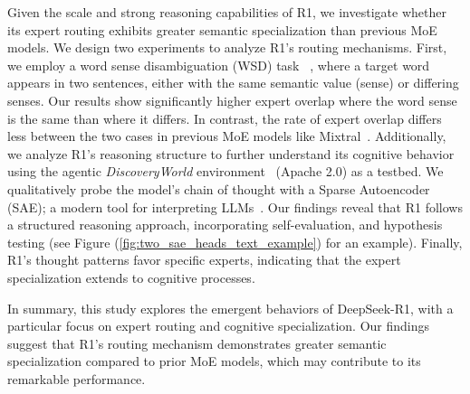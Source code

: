 Given the scale and strong reasoning capabilities %
of R1, we investigate whether its expert routing exhibits greater semantic specialization than previous MoE models.
We design two experiments to analyze R1’s routing mechanisms. First, we employ a word sense disambiguation (WSD) task ~\cite{pilehvar2018wic}, where a target word appears in two sentences, either with the same semantic value (sense) or differing senses. 
Our results show significantly higher expert overlap where the word sense is the same than where it differs.
In contrast, the rate of expert overlap differs less between the two cases in previous MoE models like Mixtral~\cite{jiang2024mixtral}. 
Additionally, we analyze R1's reasoning structure to further understand its cognitive behavior using the agentic \textit{DiscoveryWorld} environment~\cite{jansen2024discoveryworld} (Apache 2.0) as a testbed. We qualitatively probe the model's chain of thought with a Sparse Autoencoder (SAE); a modern tool for interpreting LLMs~\cite{cunningham2023sparse}. Our findings reveal that R1 follows a structured reasoning approach, incorporating self-evaluation, and hypothesis testing (see Figure (\ref{fig:two_sae_heads_text_example}) for an example). 
Finally, R1's thought patterns favor specific experts, indicating that the expert specialization extends to cognitive processes. 

In summary, this study explores the emergent behaviors of DeepSeek-R1, with a particular focus on expert routing and cognitive specialization. Our findings suggest that R1’s routing mechanism demonstrates greater semantic specialization compared to prior MoE models, which may contribute to its remarkable performance.


